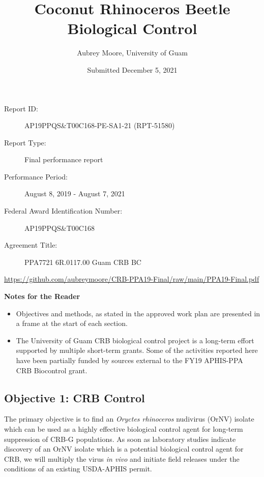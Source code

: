 \documentclass[12pt,letterpaper,english,bibliography=totocnumbered,abstract=on]{scrartcl}
\begin{document}
\titlehead{USDA-APHIS Final Report}
\title{Coconut Rhinoceros Beetle Biological Control}
\author{Aubrey Moore, University of Guam}
\date{Submitted December 5, 2021}
\maketitle
\begin{description}	
	\item[Report ID:] AP19PPQS\&T00C168-PE-SA1-21 (RPT-51580)
	\item[Report Type:] Final performance report
	\item[Performance Period:] August 8, 2019 - August 7, 2021
	\item[Federal Award Identification Number:] AP19PPQS\&T00C168
	\item[Agreement Title:] PPA7721 6R.0117.00 Guam CRB BC
\end{description}

\begin{footnotesize}
\url{https://github.com/aubreymoore/CRB-PPA19-Final/raw/main/PPA19-Final.pdf}
\end{footnotesize}

\newpage{}
\tableofcontents{}

\listoftodos

\clearpage
\textbf{Notes for the Reader}
\begin{itemize}	
	\item Objectives and methods, as stated in the approved work plan \cite{mooreWorkPlanAPHISPPA2020} are presented in a frame at the start of each section. 	
	\item The University of Guam CRB biological control project is a long-term effort supported by multiple short-term grants. Some of the activities reported here have been partially funded by sources external to the FY19 APHIS-PPA CRB Biocontrol grant.  	
\end{itemize}


\newpage

\begin{framed}
\section{Objective 1: CRB Control}

The primary objective is to find an \textit{Oryctes rhinoceros} nudivirus (OrNV) isolate which can be used as a highly effective biological control agent for long-term suppression of CRB-G populations. As soon as laboratory studies indicate discovery of an OrNV isolate which is a potential biological control agent for CRB, we will multiply the virus \textit{in vivo} and initiate field releases under the conditions of an existing USDA-APHIS permit.
\end{framed}
\end{document}
